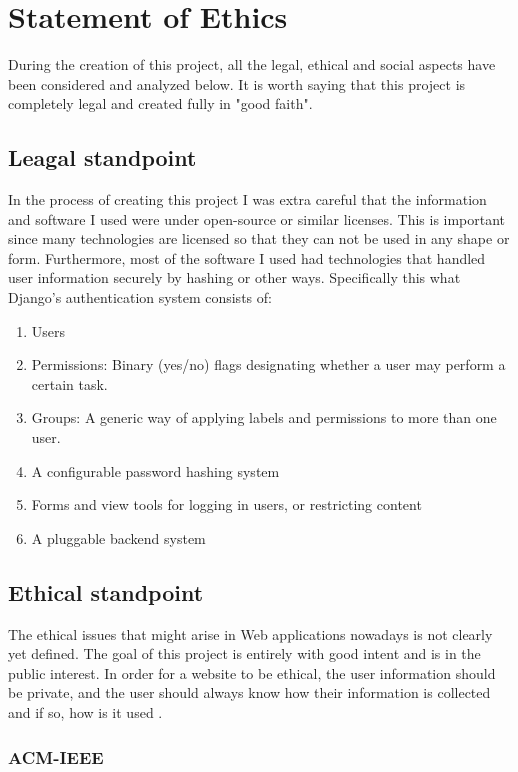 
\chapter {Statement of Ethics}
During the creation of this project, all the legal, ethical and social aspects have been considered and analyzed below. It is worth saying that this project is completely legal and created fully in "good faith".

\section{Leagal standpoint}
In the process of creating this project I was extra careful that the information and software I used were under open-source or similar licenses. This is important since many technologies are licensed so that they can not be used in any shape or form. Furthermore, most of the software I used had technologies that handled user information securely by hashing or other ways. Specifically this what Django's authentication system consists of:

\begin{enumerate}
  \item Users
  \item Permissions: Binary (yes/no) flags designating whether a user may perform a certain task.
  \item Groups: A generic way of applying labels and permissions to more than one user.
  \item A configurable password hashing system
  \item Forms and view tools for logging in users, or restricting content
  \item A pluggable backend system
\end{enumerate}

\section{Ethical standpoint}
The ethical issues that might arise in Web applications nowadays is not clearly yet defined. The goal of this project is entirely with good intent and is in the public interest. In order for a website to be ethical, the user information should be private, and the user should always know how their information is collected and if so, how is it used \cite{harris_2009_ethical}.

\subsection{ACM-IEEE}

